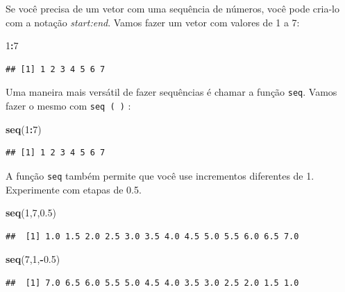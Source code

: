 \documentclass[]{book}
\newenvironment{Shaded}{\begin{snugshade}}{\end{snugshade}}
\newcommand{\DecValTok}[1]{\textcolor[rgb]{0.00,0.00,0.81}{#1}}
\newcommand{\FloatTok}[1]{\textcolor[rgb]{0.00,0.00,0.81}{#1}}
\newcommand{\KeywordTok}[1]{\textcolor[rgb]{0.13,0.29,0.53}{\textbf{#1}}}
\newcommand{\NormalTok}[1]{#1}
\newcommand{\OperatorTok}[1]{\textcolor[rgb]{0.81,0.36,0.00}{\textbf{#1}}}
\begin{document}
Se você precisa de um vetor com uma sequência de números, você pode cria-lo com a notação \emph{start:end}. Vamos fazer um vetor com valores de 1 a 7:

\begin{Shaded}
\begin{Highlighting}[]
\DecValTok{1}\OperatorTok{:}\DecValTok{7}
\end{Highlighting}
\end{Shaded}

\begin{verbatim}
## [1] 1 2 3 4 5 6 7
\end{verbatim}

Uma maneira mais versátil de fazer sequências é chamar a função \texttt{seq}. Vamos fazer o mesmo com \texttt{seq\ (\ )} :

\begin{Shaded}
\begin{Highlighting}[]
\KeywordTok{seq}\NormalTok{(}\DecValTok{1}\OperatorTok{:}\DecValTok{7}\NormalTok{)}
\end{Highlighting}
\end{Shaded}

\begin{verbatim}
## [1] 1 2 3 4 5 6 7
\end{verbatim}

A função \texttt{seq} também permite que você use incrementos diferentes de 1. Experimente com etapas de 0.5.

\begin{Shaded}
\begin{Highlighting}[]
\KeywordTok{seq}\NormalTok{(}\DecValTok{1}\NormalTok{,}\DecValTok{7}\NormalTok{,}\FloatTok{0.5}\NormalTok{)}
\end{Highlighting}
\end{Shaded}

\begin{verbatim}
##  [1] 1.0 1.5 2.0 2.5 3.0 3.5 4.0 4.5 5.0 5.5 6.0 6.5 7.0
\end{verbatim}

\begin{Shaded}
\begin{Highlighting}[]
\KeywordTok{seq}\NormalTok{(}\DecValTok{7}\NormalTok{,}\DecValTok{1}\NormalTok{,}\OperatorTok{-}\FloatTok{0.5}\NormalTok{) }
\end{Highlighting}
\end{Shaded}

\begin{verbatim}
##  [1] 7.0 6.5 6.0 5.5 5.0 4.5 4.0 3.5 3.0 2.5 2.0 1.5 1.0
\end{verbatim}
\end{document}
